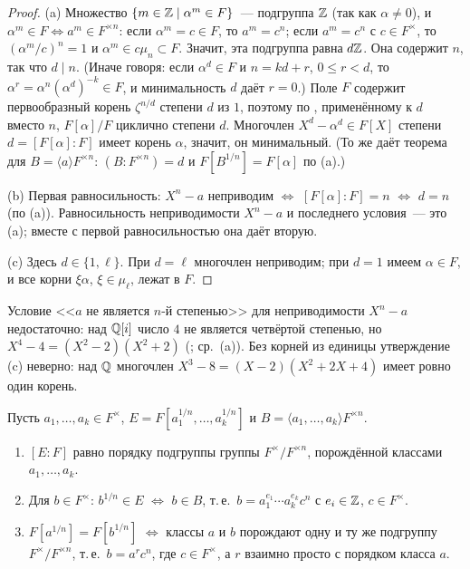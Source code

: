 \begin{proof}
(a) Множество $\{m\in\mathbb Z\mid\alpha^m\in F\}$~--- подгруппа $\mathbb Z$ (так как $\alpha\ne0$), и $\alpha^m\in F\iff a^m\in
F^{\times n}$: если $\alpha^m=c\in F$, то $a^m=c^n$; если $a^m=c^n$ с $c\in F^\times$, то $(\alpha^m/c)^n=1$ и
$\alpha^m\in c\mu_n\subset F$. Значит, эта подгруппа равна $d\mathbb Z$. Она содержит $n$, так что $d\mid n$. (Иначе говоря:
если $\alpha^d\in F$ и $n=kd+r$, $0\le r<d$, то $\alpha^r=\alpha^n(\alpha^d)^{-k}\in F$, и минимальность $d$ даёт $r=0$.)
Поле $F$ содержит первообразный корень $\zeta^{n/d}$ степени $d$ из $1$, поэтому по , применённому к $d$ вместо $n$,
$F[\alpha]/F$ циклично степени $d$. Многочлен $X^d-\alpha^d\in F[X]$ степени $d=[F[\alpha]:F]$ имеет корень $\alpha$,
значит, он минимальный. (То же даёт теорема  для $B=\langle a\rangle F^{\times n}$: $(B:F^{\times n})=d$ и
$F[B^{1/n}]=F[\alpha]$ по (a).)

(b) Первая равносильность: $X^n-a$ неприводим $\iff$ $[F[\alpha]:F]=n$ $\iff$ $d=n$ (по (a)). Равносильность
неприводимости $X^n-a$ и последнего условия~--- это (a); вместе с первой равносильностью она даёт вторую.

(c) Здесь $d\in\{1,\ell\}$. При $d=\ell$ многочлен неприводим; при $d=1$ имеем $\alpha\in F$, и все корни $\xi\alpha$,
$\xi\in\mu_\ell$, лежат в $F$.
\end{proof}

Условие <<$a$ не является $n$-й степенью>> для неприводимости $X^n-a$ недостаточно: над $\mathbb Q[i]$ число $4$ не является
четвёртой степенью, но $X^4-4=(X^2-2)(X^2+2)$ (; ср.\ (a)). Без корней из единицы утверждение (c) неверно: над $\mathbb Q$ многочлен
$X^3-8=(X-2)(X^2+2X+4)$ имеет ровно один корень.

\begin{corollary}
Пусть $a_1,\dots,a_k\in F^\times$, $E=F[a_1^{1/n},\dots,a_k^{1/n}]$ и $B=\langle a_1,\dots,a_k\rangle F^{\times n}$.
\begin{enumerate}[label=\textup{(\alph*)}]
\item $[E:F]$ равно порядку подгруппы группы $F^\times/F^{\times n}$, порождённой классами $a_1,\dots,a_k$.
\item Для $b\in F^\times$: $b^{1/n}\in E$ $\iff$ $b\in B$, т.\,е.\ $b=a_1^{e_1}\cdots a_k^{e_k}c^n$ с $e_i\in\mathbb Z$,
$c\in F^\times$.
\item $F[a^{1/n}]=F[b^{1/n}]$ $\iff$ классы $a$ и $b$ порождают одну и ту же подгруппу $F^\times/F^{\times n}$, т.\,е.\
$b=a^rc^n$, где $c\in F^\times$, а $r$ взаимно просто с порядком класса $a$.
\end{enumerate}
\end{corollary}

